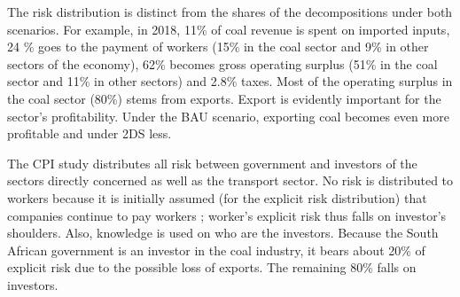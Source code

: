 \documentclass[12pt,english]{article}
\begin{document}
The risk distribution is distinct from the shares of the decompositions under both scenarios. For example, in 2018, 11\% of coal revenue is spent on imported inputs, 24 \% goes to the payment of workers (15\% in the coal sector and 9\% in other sectors of the economy), 62\% becomes gross operating surplus (51\% in the coal sector and 11\% in other sectors) and 2.8\% taxes.
Most of the operating surplus in the coal sector (80\%) stems from exports. Export is evidently important for the sector's profitability. Under the BAU scenario, exporting coal becomes even more profitable and under 2DS less. 

The CPI study distributes all risk between government and investors of the sectors directly concerned as well as the transport sector. No risk is distributed to workers because it is initially assumed (for the explicit risk distribution) that companies continue to pay workers ; worker's explicit risk thus falls on investor's shoulders. Also, knowledge is used on who are the investors. Because the South African government is an investor in the coal industry, it bears about 20\% of explicit risk due to the possible loss of exports. The remaining 80\% falls on investors.


\end{document}
